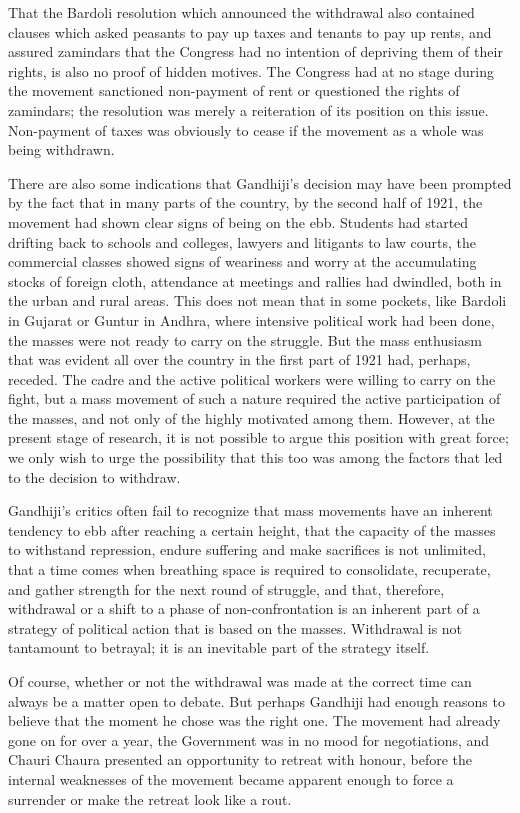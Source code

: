 That the Bardoli resolution which announced the withdrawal also contained clauses which asked peasants to pay up taxes and tenants to pay up rents, and assured zamindars that the Congress had no intention of depriving them of their rights, is also no proof of hidden motives. The Congress had at no stage during the movement sanctioned non-payment of rent or questioned the rights of zamindars; the resolution was merely a reiteration of its position on this issue. Non-payment of taxes was obviously to cease if the movement as a whole was being withdrawn. 

There are also some indications that Gandhiji’s decision may have been prompted by the fact that in many parts of the country, by the second half of 1921, the movement had shown clear signs of being on the ebb. Students had started drifting back to schools and colleges, lawyers and litigants to law courts, the commercial classes showed signs of weariness and worry at the accumulating stocks of foreign cloth, attendance at meetings and rallies had dwindled, both in the urban and rural areas. This does not mean that in some pockets, like Bardoli in Gujarat or Guntur in Andhra, where intensive political work had been done, the masses were not ready to carry on the struggle. But the mass enthusiasm that was evident all over the country in the first part of 1921 had, perhaps, receded. The cadre and the active political workers were willing to carry on the fight, but a mass movement of such a nature required the active participation of the masses, and not only of the highly motivated among them. However, at the present stage of research, it is not possible to argue this position with great force; we only wish to urge the possibility that this too was among the factors that led to the decision to withdraw. 

Gandhiji’s critics often fail to recognize that mass movements have an inherent tendency to ebb after reaching a certain height, that the capacity of the masses to withstand repression, endure suffering and make sacrifices is not unlimited, that a time comes when breathing space is required to consolidate, recuperate, and gather strength for the next round of struggle, and that, therefore, withdrawal or a shift to a phase of non-confrontation is an inherent part of a strategy of political action that is based on the masses. Withdrawal is not tantamount to betrayal; it is an inevitable part of the strategy itself. 

Of course, whether or not the withdrawal was made at the correct time can always be a matter open to debate. But perhaps Gandhiji had enough reasons to believe that the moment he chose was the right one. The movement had already gone on for over a year, the Government was in no mood for negotiations, and Chauri Chaura presented an opportunity to retreat with honour, before the internal weaknesses of the movement became apparent enough to force a surrender or make the retreat look like a rout.

